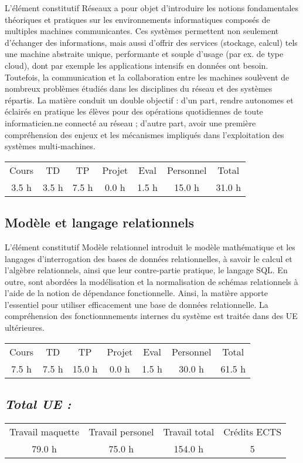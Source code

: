 %
L'élément constitutif Réseaux a pour objet d’introduire les notions fondamentales théoriques et pratiques sur les environnements informatiques composés de multiples machines communicantes. Ces systèmes permettent non seulement d'échanger des informations, mais aussi d'offrir des services (stockage, calcul) tels une machine abstraite unique, performante et souple d'usage (par ex. de type cloud), dont par exemple les applications intensifs en données ont besoin. Toutefois, la communication et la collaboration entre les machines soulèvent de nombreux problèmes étudiés dans les disciplines du réseau et des systèmes répartis. La matière conduit un double objectif : d'un part, rendre autonomes et éclairés en pratique les élèves pour des opérations quotidiennes de toute informaticien.ne connecté au réseau ; d'autre part, avoir une première compréhension des enjeux et les mécanismes impliqués dans l'exploitation des systèmes multi{-}machines.%
\begin{longtable}{c c c c c c c}%
\hline%
Cours&TD&TP&Projet&Eval&Personnel&Total\\%
3.5 h&3.5 h&7.5 h&0.0 h&1.5 h&15.0 h&31.0 h\\%
\hline%
\end{longtable}%
\subsection{Modèle et langage relationnels}%
\label{subsec:Modleetlangagerelationnels}%

%
L'élément constitutif Modèle relationnel introduit le modèle mathématique et les langages d’interrogation des bases de données relationnelles, à savoir le calcul et l’algèbre relationnels, ainsi que leur contre{-}partie pratique, le langage SQL. En outre, sont abordées la modélisation et la normalisation de schémas relationnels à l’aide de la notion de dépendance fonctionnelle. Ainsi, la matière apporte l'essentiel pour utiliser efficacement une base de données relationnelle. La compréhension des fonctionnnements internes du système est traitée dans des UE ultérieures.%
\begin{longtable}{c c c c c c c}%
\hline%
Cours&TD&TP&Projet&Eval&Personnel&Total\\%
7.5 h&7.5 h&15.0 h&0.0 h&1.5 h&30.0 h&61.5 h\\%
\hline%
\end{longtable}%
\subsection{\textit{Total UE :}}%
\label{subsec:textitTotalUE}%

%
\begin{longtable}{c c c c}%
\hline%
Travail maquette&Travail personel&Travail total&Crédits ECTS\\%
79.0 h&75.0 h&154.0 h&5\\%
\hline%
\end{longtable}